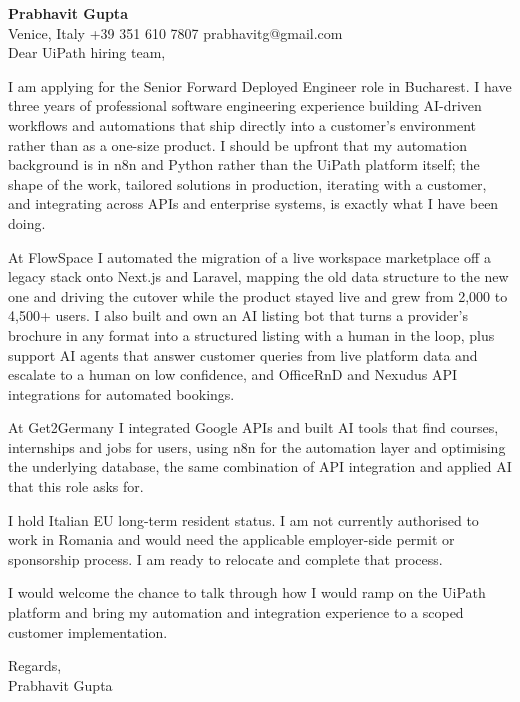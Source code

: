 \documentclass[a4paper,10.5pt]{article}
\begin{document}
\textbf{Prabhavit Gupta}\\
Venice, Italy \textbar{} +39 351 610 7807 \textbar{} prabhavitg@gmail.com\\[10pt]
Dear UiPath hiring team,

I am applying for the Senior Forward Deployed Engineer role in Bucharest. I have three years of professional software engineering experience building AI-driven workflows and automations that ship directly into a customer's environment rather than as a one-size product. I should be upfront that my automation background is in n8n and Python rather than the UiPath platform itself; the shape of the work, tailored solutions in production, iterating with a customer, and integrating across APIs and enterprise systems, is exactly what I have been doing.

At FlowSpace I automated the migration of a live workspace marketplace off a legacy stack onto Next.js and Laravel, mapping the old data structure to the new one and driving the cutover while the product stayed live and grew from 2,000 to 4,500+ users. I also built and own an AI listing bot that turns a provider's brochure in any format into a structured listing with a human in the loop, plus support AI agents that answer customer queries from live platform data and escalate to a human on low confidence, and OfficeRnD and Nexudus API integrations for automated bookings.

At Get2Germany I integrated Google APIs and built AI tools that find courses, internships and jobs for users, using n8n for the automation layer and optimising the underlying database, the same combination of API integration and applied AI that this role asks for.

I hold Italian EU long-term resident status. I am not currently authorised to work in Romania and would need the applicable employer-side permit or sponsorship process. I am ready to relocate and complete that process.

I would welcome the chance to talk through how I would ramp on the UiPath platform and bring my automation and integration experience to a scoped customer implementation.

Regards,\\
Prabhavit Gupta
\end{document}

